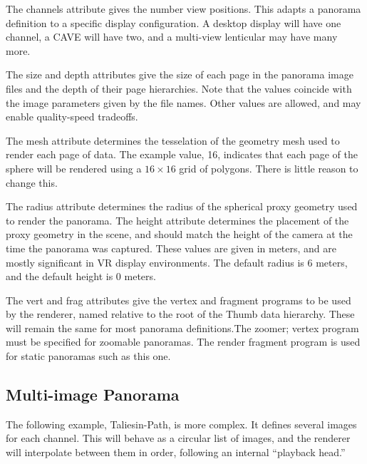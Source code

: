 \documentclass[oneside,11pt]{memoir}
\begin{document}
\begin{Spacing}{1.1}
The channels attribute gives the number view positions. This adapts a panorama definition to a specific display configuration. A desktop display will have one channel, a CAVE will have two, and a multi-view lenticular may have many more.

The size and depth attributes give the size of each page in the panorama image files and the depth of their page hierarchies. Note that the values coincide with the image parameters given by the file names. Other values are allowed, and may enable quality-speed tradeoffs.

The mesh attribute determines the tesselation of the geometry mesh used to render each page of data. The example value, 16, indicates that each page of the sphere will be rendered using a $16\times 16$ grid of polygons. There is little reason to change this.

The radius attribute determines the radius of the spherical proxy geometry used to render the panorama. The height attribute determines the placement of the proxy geometry in the scene, and should match the height of the camera at the time the panorama was captured. These values are given in meters, and are mostly significant in VR display environments. The default radius is 6 meters, and the default height is 0 meters.

The vert and frag attributes give the vertex and fragment programs to be used by the renderer, named relative to the root of the Thumb data hierarchy. These will remain the same for most panorama definitions.The zoomer; vertex program must be specified for zoomable panoramas. The render fragment program is used for static panoramas such as this one.

\subsection{Multi-image Panorama}

The following example, Taliesin-Path, is more complex. It defines several images for each channel. This will behave as a circular list of images, and the renderer will interpolate between them in order, following an internal “playback head.”


\end{Spacing}
\end{document}
